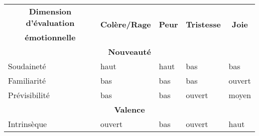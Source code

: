 \begin{table}[tbp]
\begin{tabular}{|l|l|l|l|l|}
\hline
\multicolumn{1}{|c|}{\textbf{Dimension d’évaluation}} & \multicolumn{1}{c|}{\multirow{2}{*}{\textbf{Colère/Rage}}} & \multicolumn{1}{c|}{\multirow{2}{*}{\textbf{Peur}}} & \multicolumn{1}{c|}{\multirow{2}{*}{\textbf{Tristesse}}} & \multicolumn{1}{c|}{\multirow{2}{*}{\textbf{Joie}}} \\
\multicolumn{1}{|c|}{\textbf{émotionnelle}}           & \multicolumn{1}{c|}{}                                      & \multicolumn{1}{c|}{}                               & \multicolumn{1}{c|}{}                                    & \multicolumn{1}{c|}{}                               \\ \hline
\multicolumn{5}{|c|}{\textbf{Nouveauté}}                                                                                                                                                                                                                                                  \\ \hline
Soudaineté                                            & haut                                                       & haut                                                & bas                                                      & bas                                                 \\ \hline
Familiarité                                           & bas                                                        & bas                                                 & bas                                                      & ouvert                                              \\ \hline
Prévisibilité                                         & bas                                                        & bas                                                 & ouvert                                                   & moyen                                               \\ \hline
\multicolumn{5}{|c|}{\textbf{Valence}}                                                                                                                                                                                                                                                    \\ \hline
Intrinsèque                                           & ouvert                                                     & bas                                                 & ouvert                                                   & haut                                                \\ \hline

\end{tabular}
\end{table}
